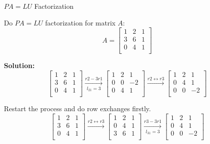 \documentclass{beamer}
\begin{document}
\begin{frame}{$PA=LU$ Factorization}
\begin{example}
    Do $PA=LU$ factorization for matrix $A$:
    \begin{equation*}
        A=\left[ \begin{matrix}
            1&		2&		1\\
            3&		6&		1\\
            0&		4&		1\\
        \end{matrix} \right]
    \end{equation*}
\end{example}
\textbf{Solution:}
\begin{equation*}
    \left[ \begin{matrix}
        1&		2&		1\\
        3&		6&		1\\
        0&		4&		1\\
    \end{matrix} \right] \xrightarrow[l_{21}=3]{r2-3r1}\left[ \begin{matrix}
        1&		2&		1\\
        0&		0&		-2\\
        0&		4&		1\\
    \end{matrix} \right] \xrightarrow{r2\leftrightarrow r3}\left[ \begin{matrix}
        1&		2&		1\\
        0&		4&		1\\
        0&		0&		-2\\
    \end{matrix} \right]
\end{equation*}

Restart the process and do row exchanges firstly.
\begin{equation*}
    \left[ \begin{matrix}
        1&		2&		1\\
        3&		6&		1\\
        0&		4&		1\\
    \end{matrix} \right] \xrightarrow{r2\leftrightarrow r3}\left[ \begin{matrix}
        1&		2&		1\\
        0&		4&		1\\
        3&		6&		1\\
    \end{matrix} \right] \xrightarrow[l_{31}=3]{r3-3r1}\left[ \begin{matrix}
        1&		2&		1\\
        0&		4&		1\\
        0&		0&		-2\\
    \end{matrix} \right]
\end{equation*}
\end{frame}
\end{document}
